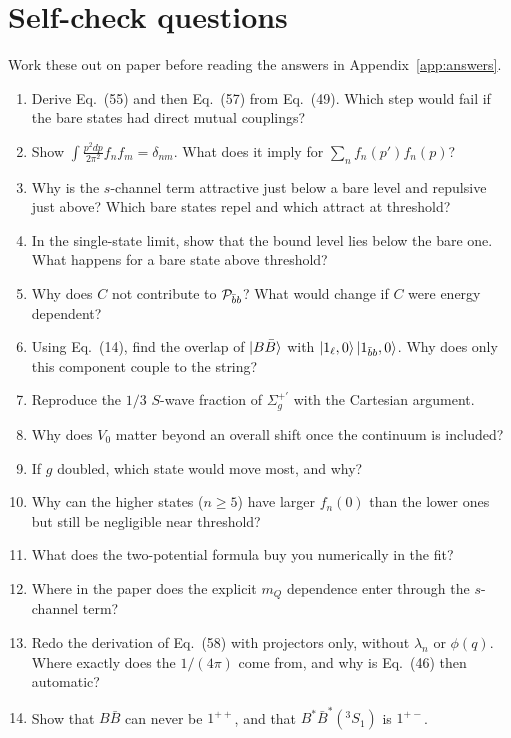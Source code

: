 \documentclass[11pt,a4paper]{article}
\newcommand{\Pbb}{{\cal P}_{\bar bb}}
\begin{document}
\section{Self-check questions}
\label{sec:selfcheck}

Work these out on paper before reading the answers in Appendix~\ref{app:answers}.
\begin{enumerate}
\item Derive Eq.~(55) and then Eq.~(57) from Eq.~(49). Which step would fail if the bare states had direct mutual couplings?
\item Show $\int\frac{p^2dp}{2\pi^2}f_nf_m=\delta_{nm}$. What does it imply for $\sum_nf_n(p')f_n(p)$?
\item Why is the $s$-channel term attractive just below a bare level and repulsive just above? Which bare states repel and which attract at threshold?
\item In the single-state limit, show that the bound level lies below the bare one. What happens for a bare state above threshold?
\item Why does $C$ not contribute to $\Pbb$? What would change if $C$ were energy dependent?
\item Using Eq.~(14), find the overlap of $\ket{B\bar B}$ with $\ket{1_\ell,0}\ket{1_{\bar bb},0}$. Why does only this component couple to the string?
\item Reproduce the $1/3$ $S$-wave fraction of $\Sigma_g^{+\prime}$ with the Cartesian argument.
\item Why does $V_0$ matter beyond an overall shift once the continuum is included?
\item If $g$ doubled, which state would move most, and why?
\item Why can the higher states ($n\ge5$) have larger $f_n(0)$ than the lower ones but still be negligible near threshold?
\item What does the two-potential formula buy you numerically in the fit?
\item Where in the paper does the explicit $m_Q$ dependence enter through the $s$-channel term?
\item Redo the derivation of Eq.~(58) with projectors only, without $\lambda_n$ or $\phi(q)$. Where exactly does the $1/(4\pi)$ come from, and why is Eq.~(46) then automatic?
\item Show that $B\bar B$ can never be $1^{++}$, and that $B^*\bar B^*(^3S_1)$ is $1^{+-}$.

\end{enumerate}
\end{document}
